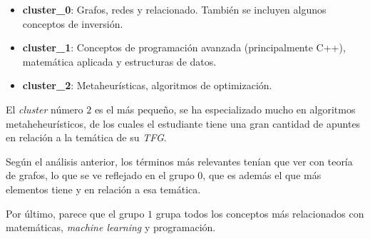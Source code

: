 \documentclass[12pt,letterpaper]{article}
\begin{document}
\begin{itemize}
    \item \textbf{cluster\_0}: Grafos, redes y relacionado. También se incluyen algunos conceptos de inversión.
    \item \textbf{cluster\_1}: Conceptos de programación avanzada (principalmente C++), matemática aplicada y estructuras de datos.
    \item \textbf{cluster\_2}: Metaheurísticas, algoritmos de optimización.
\end{itemize}
  
El \textit{cluster} número $2$ es el más pequeño, se ha especializado mucho en algoritmos metaheheurísticos, de los cuales el estudiante tiene una gran cantidad de apuntes en relación a la temática de su \textit{TFG}. 

Según el análisis anterior, los términos más relevantes tenían que ver con teoría de grafos, lo que se ve reflejado en el grupo $0$, que es además el que más elementos tiene y en relación a esa temática. 

Por último, parece que el grupo $1$ grupa todos los conceptos más relacionados con matemáticas, \textit{machine learning} y programación.
\end{document}

